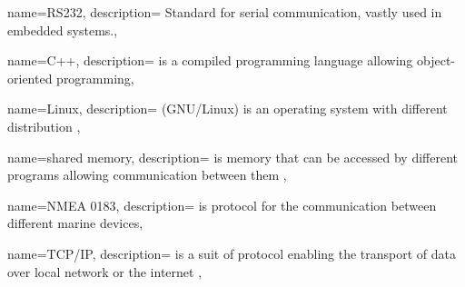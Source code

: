 
{name=RS232,
 description= {Standard for serial communication, vastly used in embedded systems.},
}

{name=C++,
 description= { is a compiled programming language allowing object-oriented programming},
}

{name=Linux,
 description= { (GNU/Linux) is an operating system with different distribution },
}

{name=shared memory,
 description= {  is memory that can be accessed by different programs allowing communication between them },
}

{name=NMEA 0183,
 description= { is protocol for the communication between different marine devices},
}

{name=TCP/IP,
 description= { is a suit of protocol enabling the transport of data over local network or the internet },
}



